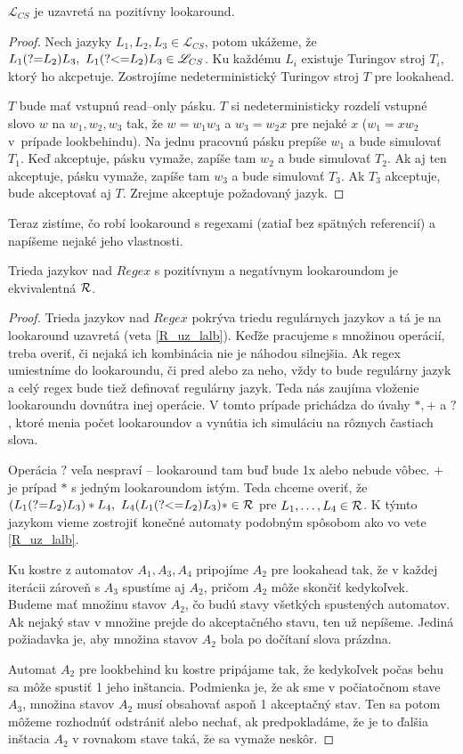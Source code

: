 \documentclass{svk_long_sk}
\def\R{{\cal R}} %
\def\L{\mathscr{L}} %
\def\re{Regex}
\def\lookahead{\text{(?=}}
\def\lookbehind{\text{(?\textless =}}
\begin{document}
\begin{theorem}
$\L_{CS}$ je uzavretá na pozitívny lookaround.
\end{theorem}
\begin{proof}
Nech jazyky $L_1,L_2,L_3\in\L_{CS}$, potom ukážeme, že $L_1\lookahead L_2)L_3, ~L_1\lookbehind L_2) L_3 \in\L_{CS}$. Ku každému $L_i$ existuje Turingov stroj $T_i$, ktorý ho akcpetuje. Zostrojíme nedeterministický Turingov stroj $T$ pre lookahead.

$T$ bude mať vstupnú read--only pásku. $T$ si nedeterministicky rozdelí vstupné slovo $w$ na $w_1,w_2, w_3$ tak, že $w = w_1w_3$ a $w_3=w_2x$ pre nejaké $x$ ($w_1=xw_2$ v~prípade lookbehindu). Na jednu pracovnú pásku prepíše $w_1$ a bude simulovať $T_1$. Keď akceptuje, pásku vymaže, zapíše tam $w_2$ a bude simulovať $T_2$. Ak aj ten akceptuje, pásku vymaže, zapíše tam $w_3$ a bude simulovať $T_3$. Ak $T_3$ akceptuje, bude akceptovať aj $T$. Zrejme akceptuje požadovaný jazyk.
\end{proof}

Teraz zistíme, čo robí lookaround s regexami (zatiaľ bez spätných referencií) a napíšeme nejaké jeho vlastnosti.

\begin{theorem}\label{re_lalb_in_R}
Trieda jazykov nad $\re$ s pozitívnym a negatívnym lookaroundom je ekvivalentná $\R$.
\end{theorem}
\begin{proof}
Trieda jazykov nad $\re$ pokrýva triedu regulárnych jazykov a tá je na lookaround uzavretá (veta \ref{R_uz_lalb}). Keďže pracujeme s množinou operácií, treba overiť, či nejaká ich kombinácia nie je náhodou silnejšia. Ak regex umiestníme do lookaroundu, či pred alebo za neho, vždy to bude regulárny jazyk a celý regex bude tiež definovať regulárny jazyk. Teda nás zaujíma vloženie lookaroundu dovnútra inej operácie. V tomto prípade prichádza do úvahy $*,+$ a $?$, ktoré menia počet lookaroundov a vynútia ich simuláciu na rôznych častiach slova.

Operácia $?$ veľa nespraví -- lookaround tam buď bude 1x alebo nebude vôbec. $+$ je prípad $*$ s jedným lookaroundom istým. Teda chceme overiť, že $(L_1 \lookahead L_2) L_3)*L_4,~L_4(L_1 \lookbehind L_2) L_3)* \in \R$ pre $L_1,\dots,L_4\in\R$. K týmto jazykom vieme zostrojiť konečné automaty podobným spôsobom ako vo vete \ref{R_uz_lalb}. 

Ku kostre z automatov $A_1,A_3,A_4$ pripojíme $A_2$ pre lookahead tak, že v každej iterácii zároveň s $A_3$ spustíme aj $A_2$, pričom $A_2$ môže skončiť kedykoľvek. Budeme mať množinu stavov $A_2$, čo budú stavy všetkých spustených automatov. Ak nejaký stav v množine prejde do akceptačného stavu, ten už nepíšeme. Jediná požiadavka je, aby množina stavov $A_2$ bola po dočítaní slova prázdna.

Automat $A_2$ pre lookbehind ku kostre pripájame tak, že kedykoľvek počas behu sa môže spustiť 1 jeho inštancia. Podmienka je, že ak sme v počiatočnom stave $A_3$, množina stavov $A_2$ musí obsahovať aspoň 1 akceptačný stav. Ten sa potom môžeme rozhodnúť odstrániť alebo nechať, ak predpokladáme, že je to ďalšia inštacia $A_2$ v rovnakom stave taká, že sa vymaže neskôr.
\end{proof}
\end{document}
